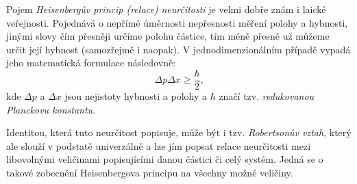 \documentclass{../../../../style/mkimain}
\begin{document}
\noindent{}
\klein
Pojem \emph{Heisenbergův princip (relace) neurčitosti} je velmi dobře znám i laické veřejnosti.
Pojednává o nepřímé úměrnosti nepřesnosti měření polohy a hybnosti, jinými slovy čím přesněji určíme polohu částice,
tím méně přesně už můžeme určit její hybnost (samozřejmě i naopak). V jednodimenzionálním případě vypadá jeho matematická formulace následovně:
$$\Delta p \Delta x \geq \frac{\hbar}{2}\text{,}$$
kde $\Delta p$ a $\Delta x$ jsou nejistoty hybnosti a polohy a $\hbar$ značí tzv. \emph{redukovanou Planckovu konstantu}.

Identitou, která tuto neurčitost popisuje, může být i tzv. \emph{Robertsonův vztah},
který ale slouží v podstatě univerzálně a lze jím popsat relace neurčitosti mezi libovolnými veličinami popisujícími danou částici či celý systém.
Jedná se o takové zobecnění Heisenbergova principu na všechny možné veličiny.

\end{document}
